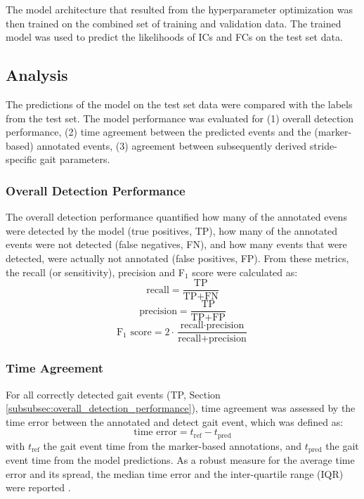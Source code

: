 \documentclass[sensors,article,submit,pdftex,moreauthors]{Definitions/mdpi}
\begin{document}
The model architecture that resulted from the hyperparameter optimization was then trained on the combined set of training and validation data. The trained model was used to predict the likelihoods of ICs and FCs on the test set data.

\subsection{Analysis}
The predictions of the model on the test set data were compared with the labels from the test set. The model performance was evaluated for (1) overall detection performance, (2) time agreement between the predicted events and the (marker-based) annotated events, (3) agreement between subsequently derived stride-specific gait parameters.
\subsubsection{Overall Detection Performance \label{subsubsec:overall_detection_performance}}
The overall detection performance quantified how many of the annotated evens were detected by the model (true positives, TP), how many of the annotated events were not detected (false negatives, FN), and how many events that were detected, were actually not annotated (false positives, FP). From these metrics, the recall (or sensitivity), precision and F$_{1}$ score were calculated as:
\begin{equation}
	\textrm{recall} = \frac{\textrm{TP}}{\textrm{TP} + \textrm{FN}} 
	\label{eqn:recall}
\end{equation}
\begin{equation}
	\textrm{precision} = \frac{\textrm{TP}}{\textrm{TP} + \textrm{FP}} 
	\label{eqn:precision}
\end{equation}
\begin{equation}
	\textrm{F$_{1}$ score} = 2 \cdot \frac{\textrm{recall} \cdot \textrm{precision}}{\textrm{recall} + \textrm{precision}} 
	\label{eqn:f1_score}
\end{equation}

\subsubsection{Time Agreement}
For all correctly detected gait events (TP, Section \ref{subsubsec:overall_detection_performance}), time agreement was assessed by the time error between the annotated and detect gait event, which was defined as:
\begin{equation}
	\textrm{time error} = t_{\textrm{ref}} - t_{\textrm{pred}}
	\label{eqn:time_agreement}
\end{equation}
with $t_{\mathrm{ref}}$ the gait event time from the marker-based annotations, and $t_{\mathrm{pred}}$ the gait event time from the model predictions. As a robust measure for the average time error and its spread, the median time error and the inter-quartile range (IQR) were reported \cite{OpenIntro2019}.
\end{document}
